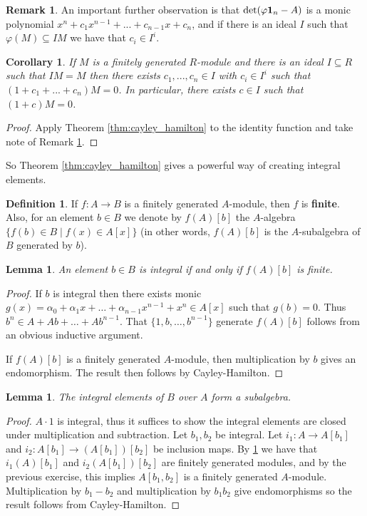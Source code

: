 \documentclass[12pt]{article}
\theoremstyle{plain}
\newtheorem{lemma}[thm]{Lemma}
\newtheorem{cor}[thm]{Corollary}
\theoremstyle{definition}
\newtheorem{defn}[thm]{Definition} %
\newtheorem{remark}[thm]{Remark}
\begin{document}
	\begin{remark}
		\label{remark:rest_of_CHT}
		An important further observation is that $\operatorname{det}(\varphi\bold{1}_n - A)$ is a monic polynomial $x^n + c_1x^{n-1} + ... + c_{n-1}x + c_n$, and if there is an ideal $I$ such that $\varphi(M) \subseteq IM$ we have that $c_i \in I^i$.
	\end{remark}
	\begin{cor}
		\label{cor:cayley_helpful_cor} If $M$ is a finitely generated $R$-module and there is an ideal $I \subseteq R$ such that $IM = M$ then there exists $c_1,...,c_n \in I$ with $c_i \in I^i$ such that $(1 + c_1 + ... + c_n)M = 0$. In particular, there exists $c \in I$ such that $(1 + c)M = 0$.
	\end{cor}
	\begin{proof}
		Apply Theorem \ref{thm:cayley_hamilton} to the identity function and take note of Remark \ref{remark:rest_of_CHT}.
	\end{proof}
	So Theorem \ref{thm:cayley_hamilton} gives a powerful way of creating integral elements.
	\begin{defn}
		If $f: A \to B$ is a finitely generated $A$-module, then $f$ is \textbf{finite}. Also, for an element $b \in B$ we denote by $f(A)[b]$ the $A$-algebra $\lbrace f(b) \in B \mid f(x) \in A[x]\rbrace$ (in other words, $f(A)[b]$ is the $A$-subalgebra of $B$ generated by $b$).
	\end{defn}
	\begin{lemma}\label{lem:int_f(A)fin}
		An element $b \in B$ is integral if and only if $f(A)[b]$ is finite.
	\end{lemma}
	\begin{proof}
		If $b$ is integral then there exists monic $g(x) = \alpha_0 + \alpha_1x + \hdots + \alpha_{n-1}x^{n-1} + x^n \in A[x]$ such that $g(b) = 0$. Thus $b^n \in A + Ab + \hdots + Ab^{n-1}$. That $\lbrace 1, b, \hdots, b^{n-1}\rbrace$ generate $f(A)[b]$ follows from an obvious inductive argument.
		
		If $f(A)[b]$ is a finitely generated $A$-module, then multiplication by $b$ gives an endomorphism. The result then follows by Cayley-Hamilton.
	\end{proof}
	\begin{lemma}
		\label{lem:int_elts_subalg}
		The integral elements of $B$ over $A$ form a subalgebra.
	\end{lemma}
	\begin{proof}
		$A\cdot 1$ is integral, thus it suffices to show the integral elements are closed under multiplication and subtraction. Let $b_1,b_2$ be integral. Let $i_1: A \to A[b_1]$ and $i_2: A[b_1] \to (A[b_1])[b_2]$ be inclusion maps. By \ref{lem:int_f(A)fin} we have that $i_1(A)[b_1]$ and $i_2(A[b_1])[b_2]$ are finitely generated modules, and by the previous exercise, this implies $A[b_1,b_2]$ is a finitely generated $A$-module. Multiplication by $b_1 - b_2$ and multiplication by $b_1b_2$ give endomorphisms so the result follows from Cayley-Hamilton.
	\end{proof}
\end{document}
